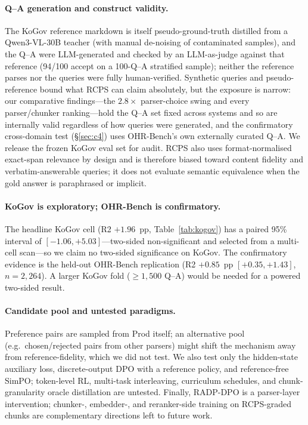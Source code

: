\documentclass[11pt]{article}
\newcommand{\rcps}{\textsc{RCPS}}
\begin{document}
\paragraph{Q--A generation and construct validity.} The KoGov reference markdown is itself pseudo-ground-truth distilled from a Qwen3-VL-30B teacher (with manual de-noising of contaminated samples), and the Q--A were LLM-generated and checked by an LLM-as-judge against that reference (94/100 accept on a 100-Q--A stratified sample); neither the reference parses nor the queries were fully human-verified. Synthetic queries and pseudo-reference bound what \rcps{} can claim absolutely, but the exposure is narrow: our comparative findings---the $2.8\times$ parser-choice swing and every parser/chunker ranking---hold the Q--A set fixed across systems and so are internally valid regardless of how queries were generated, and the confirmatory cross-domain test (\S\ref{sec:c4}) uses OHR-Bench's own externally curated Q--A. We release the frozen KoGov eval set for audit. \rcps{} also uses format-normalised exact-span relevance by design and is therefore biased toward content fidelity and verbatim-answerable queries; it does not evaluate semantic equivalence when the gold answer is paraphrased or implicit.

\paragraph{KoGov is exploratory; OHR-Bench is confirmatory.} The headline KoGov cell (R2 $+1.96$~pp, Table~\ref{tab:kogov}) has a paired 95\% interval of $[-1.06, +5.03]$---two-sided non-significant and selected from a multi-cell scan---so we claim no two-sided significance on KoGov. The confirmatory evidence is the held-out OHR-Bench replication (R2 $+0.85$~pp $[+0.35, +1.43]$, $n = 2{,}264$). A larger KoGov fold ($\ge 1{,}500$ Q--A) would be needed for a powered two-sided result.

\paragraph{Candidate pool and untested paradigms.} Preference pairs are sampled from Prod itself; an alternative pool (e.g.\ chosen/rejected pairs from other parsers) might shift the mechanism away from reference-fidelity, which we did not test. We also test only the hidden-state auxiliary loss, discrete-output DPO with a reference policy, and reference-free SimPO; token-level RL, multi-task interleaving, curriculum schedules, and chunk-granularity oracle distillation are untested. Finally, RADP-DPO is a parser-layer intervention; chunker-, embedder-, and reranker-side training on \rcps{}-graded chunks are complementary directions left to future work.
\end{document}
